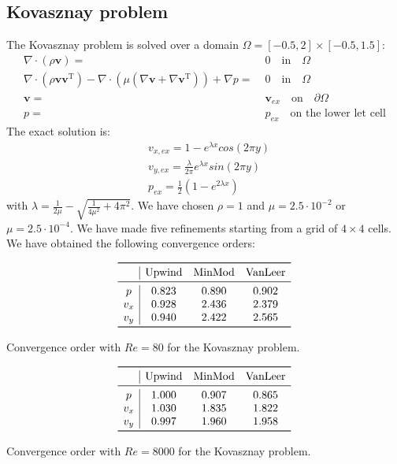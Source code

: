 \documentclass[11pt, a4paper]{article}
\theoremstyle{definition}
\begin{document}
\subsection{Kovasznay problem}
The Kovasznay problem is solved over a domain $\Omega = [-0.5,2] \times [-0.5, 
1.5]$:
\begin{align*}
\nabla \cdot (\rho \mathbf{v}) =& \; 0 \quad \text{in} \quad \Omega\\
\nabla \cdot (\rho \mathbf{v} \mathbf{v^\mathrm{T}}) - \nabla \cdot (\mu 
(\nabla 
\mathbf{v} + \nabla \mathbf{v}^\mathrm{T})) + 
\nabla p =& \; 0 \quad \text{in} \quad \Omega\\
\mathbf{v} =& \; \mathbf{v}_{ex} \quad \text{on} \quad \partial \Omega\\
p =& \; p_{ex} \quad \text{on the lower let cell}
\end{align*}
The exact solution is:
\begin{align*}
&v_{x,ex} = 1 - e^{\lambda x} cos(2 \pi y)\\
&v_{y,ex} = \frac{\lambda}{2\pi} e^{\lambda x} sin(2 \pi y)\\
&p_{ex} = \frac{1}{2} (1 - e^{2 \lambda x})
\end{align*}
with $\lambda = \frac{1}{2 \mu} - \sqrt{\frac{1}{4\mu^2} + 4\pi^2}$. We have 
chosen $\rho = 1$ and $\mu = 2.5 \cdot 10^{-2}$ or $ \mu = 2.5 \cdot 10^{-4}$.
We have made five refinements starting from a grid of $4 \times 4$ cells.
We have obtained the following convergence orders:
\begin{table}[h]
	\centering
	\[
	\begin{array}{c|ccc}
	\toprule
	& \text{Upwind} & \text{MinMod} & \text{VanLeer} \\ 
	\midrule
	p & 0.823 & 0.890 & 0.902\\
	v_x & 0.928 & 2.436 & 2.379\\
	v_y & 0.940 & 2.422 & 2.565\\
	\bottomrule
	\end{array}
	\]
	\caption{Convergence order with $Re = 80$ for the Kovasznay 
	problem.}
	\label{tab:kov_lre}
	
	\[
	\begin{array}{c|ccc}
	\toprule
	& \text{Upwind} & \text{MinMod} & \text{VanLeer} \\ 
	\midrule
	p & 1.000 & 0.907 & 0.865\\
	v_x & 1.030 & 1.835 & 1.822\\
	v_y & 0.997 & 1.960 & 1.958\\
	\bottomrule
	\end{array}
	\]
	\caption{Convergence order with $Re = 8000$ for the Kovasznay 
	problem.}
	\label{tab:kov_hre}
\end{table}
\end{document}
